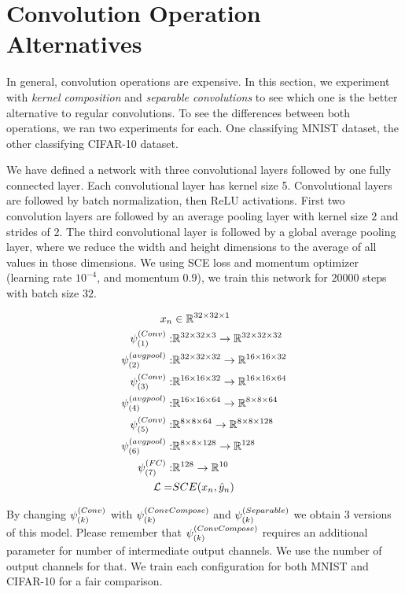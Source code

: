 \section{Convolution Operation Alternatives}
In general, convolution operations are expensive. In this section, we experiment with \textit{kernel composition} and \textit{separable convolutions} to see which one is the better alternative to regular convolutions. To see the differences between both operations, we ran two experiments for each. One classifying MNIST dataset, the other classifying CIFAR-10 dataset.

We have defined a network with three convolutional layers followed by one fully connected layer. Each convolutional layer has kernel size 5. Convolutional layers are followed by batch normalization, then ReLU activations. First two convolution layers are followed by an average pooling layer with kernel size $2$ and strides of $2$. The third convolutional layer is followed by a global average pooling layer, where we reduce the width and height dimensions to the average of all values in those dimensions. We using SCE loss and momentum optimizer (learning rate $10^{-4}$, and momentum $0.9$), we train this network for $20000$ steps with batch size $32$. 

\begin{equation*}
\begin{split}
x_{n} &\in \mathbb{R}^{32 \times 32 \times 1}\\
\psi^{(Conv)}_{(1)}:& \mathbb{R}^{32 \times 32 \times 3} \rightarrow \mathbb{R}^{32 \times 32 \times 32} \\
\psi^{(avgpool)}_{(2)}:& \mathbb{R}^{32 \times 32 \times 32} \rightarrow \mathbb{R}^{16 \times 16 \times 32} \\
\psi^{(Conv)}_{(3)}:& \mathbb{R}^{16 \times 16 \times 32} \rightarrow \mathbb{R}^{16 \times 16 \times 64} \\
\psi^{(avgpool)}_{(4)}:& \mathbb{R}^{16 \times 16 \times 64} \rightarrow \mathbb{R}^{8 \times 8 \times 64} \\
\psi^{(Conv)}_{(5)}:& \mathbb{R}^{8 \times 8 \times 64} \rightarrow \mathbb{R}^{8 \times 8 \times 128} \\
\psi^{(avgpool)}_{(6)}:& \mathbb{R}^{8 \times 8 \times 128} \rightarrow \mathbb{R}^{128} \\
\psi^{(FC)}_{(7)}:& \mathbb{R}^{128} \rightarrow \mathbb{R}^{10} \\
\mathcal{L} =& SCE(x_{n}, \hat{y}_{n})
\end{split}
\end{equation*}


By changing $\psi^{(Conv)}_{(k)}$ with $\psi_{(k)}^{(ConvCompose)}$ and $\psi_{(k)}^{(Separable)}$ we obtain 3 versions of this model. Please remember that $\psi_{(k)}^{(ConvCompose)}$ requires an additional parameter for number of intermediate output channels. We use the number of output channels for that. We train each configuration for both MNIST and CIFAR-10 for a fair comparison.

